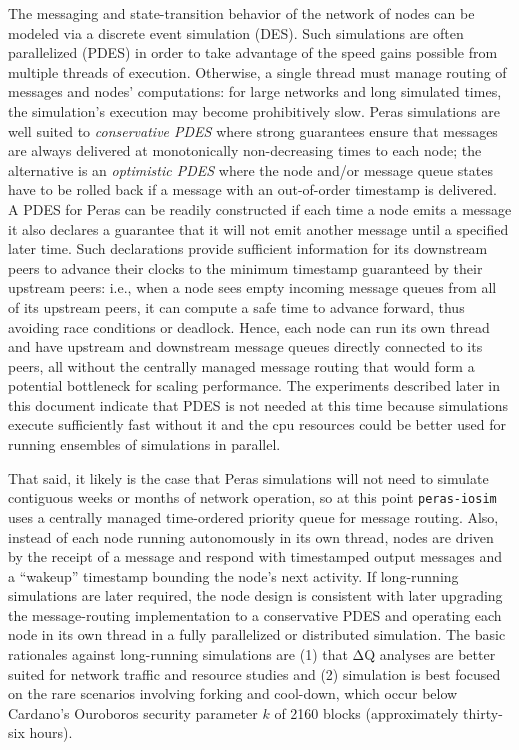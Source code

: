 \documentclass[10pt]{article}
\begin{document}
The messaging and state-transition behavior of the network of nodes can
be modeled via a discrete event simulation (DES). Such simulations are
often parallelized (PDES) in order to take advantage of the speed gains
possible from multiple threads of execution. Otherwise, a single thread
must manage routing of messages and nodes' computations: for large
networks and long simulated times, the simulation's execution may become
prohibitively slow. Peras simulations are well suited to
\emph{conservative PDES} where strong guarantees ensure that messages
are always delivered at monotonically non-decreasing times to each node;
the alternative is an \emph{optimistic PDES} where the node and/or
message queue states have to be rolled back if a message with an
out-of-order timestamp is delivered. A PDES for Peras can be readily
constructed if each time a node emits a message it also declares a
guarantee that it will not emit another message until a specified later
time. Such declarations provide sufficient information for its
downstream peers to advance their clocks to the minimum timestamp
guaranteed by their upstream peers: i.e., when a node sees empty
incoming message queues from all of its upstream peers, it can compute a
safe time to advance forward, thus avoiding race conditions or deadlock.
Hence, each node can run its own thread and have upstream and downstream
message queues directly connected to its peers, all without the
centrally managed message routing that would form a potential bottleneck
for scaling performance. The experiments described later in this
document indicate that PDES is not needed at this time because
simulations execute sufficiently fast without it and the cpu resources
could be better used for running ensembles of simulations in parallel.

That said, it likely is the case that Peras simulations will not need to
simulate contiguous weeks or months of network operation, so at this
point \texttt{peras-iosim} uses a centrally managed time-ordered
priority queue for message routing. Also, instead of each node running
autonomously in its own thread, nodes are driven by the receipt of a
message and respond with timestamped output messages and a ``wakeup''
timestamp bounding the node's next activity. If long-running simulations
are later required, the node design is consistent with later upgrading
the message-routing implementation to a conservative PDES and operating
each node in its own thread in a fully parallelized or distributed
simulation. The basic rationales against long-running simulations are
(1) that ΔQ analyses are better suited for network traffic and resource
studies and (2) simulation is best focused on the rare scenarios
involving forking and cool-down, which occur below Cardano's Ouroboros
security parameter \(k\) of 2160 blocks (approximately thirty-six
hours).
\end{document}
